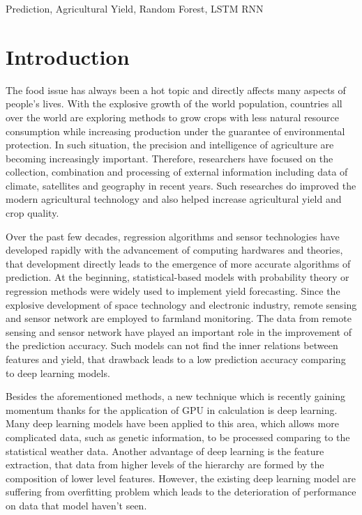 \documentclass[conference, a4paper]{IEEEtran}
\begin{document}
\begin{IEEEkeywords}
  Prediction, Agricultural Yield, Random Forest, LSTM RNN
\end{IEEEkeywords}

\section{Introduction}
  The food issue has always been a hot topic and directly affects many aspects of people's lives. With the explosive growth of the world population, countries all over the world are exploring methods to grow crops with less natural resource consumption while increasing production under the guarantee of environmental protection. In such situation, the precision and intelligence of agriculture are becoming increasingly important. Therefore, researchers have focused on the collection, combination and processing of external information including data of climate, satellites and geography in recent years. Such researches do improved the modern agricultural technology and also helped increase agricultural yield and crop quality.\par
  Over the past few decades, regression algorithms and sensor technologies have developed rapidly with the advancement of computing hardwares and theories, that development directly leads to the emergence of more accurate algorithms of prediction. At the beginning, statistical-based models with probability theory or regression methods were widely used to implement yield forecasting\cite{matisMarkovChainApproach1985, stephensCropYieldForecasting1995}. Since the explosive development of space technology and electronic industry, remote sensing and sensor network are employed to farmland monitoring.  The data from remote sensing and sensor network have played an important role in the improvement of the prediction accuracy\cite{youDeepGaussianProcess2017, baruthUseRemoteSensing}. Such models can not find the inner relations between features and yield, that drawback leads to a low prediction accuracy comparing to deep learning models.\par
  Besides the aforementioned methods, a new technique which is recently gaining momentum thanks for the application of GPU in calculation is deep learning. Many deep learning models have been applied to this area, which allows more complicated data, such as genetic information, to be processed comparing to the statistical weather data\cite{mateo-sanchisSynergisticIntegrationOptical2019,steenUsingDeepLearning2016a}. Another advantage of deep learning is the feature extraction, that data from higher levels of the hierarchy are formed by the composition of lower level features\cite{lecunDeepLearning2015}. However, the existing deep learning model are suffering from overfitting problem which leads to the deterioration of performance on data that model haven't seen. \par
\end{document}
